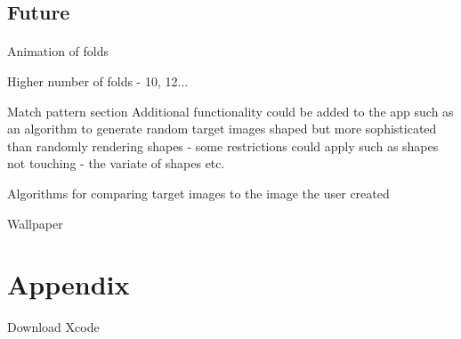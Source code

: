 \documentclass[11pt]{article}
\begin{document}
        
        \subsection{Future}
        
                \paragraph{}
                
                Animation of folds
                
                Higher number of folds - 10, 12...
                
                Match pattern section
                Additional functionality could be added to the app such as an algorithm to generate random target images shaped but more sophisticated than randomly rendering shapes - some restrictions could apply such as shapes not touching - the variate of shapes etc.
                
                Algorithms for comparing target images to the image the user created 
                
                
                Wallpaper

        
\newpage
\let\Section\section 
\def\section*#1{\Section{#1}}  

    
    
\newpage
\Section{Appendix}
Download Xcode
        
\end{document}
